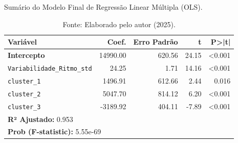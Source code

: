 \begin{table}[H]
\centering
\caption{Sumário do Modelo Final de Regressão Linear Múltipla (OLS).}
\label{tab:modelo_regressao}
\begin{tabular}{lrrrr}
\toprule
\textbf{Variável} & \textbf{Coef.} & \textbf{Erro Padrão} & \textbf{t} & \textbf{P>|t|} \\
\midrule
\textbf{Intercepto} & 14990.00 & 620.56 & 24.15 & <0.001 \\
\texttt{Variabilidade\_Ritmo\_std} & 24.25 & 1.71 & 14.16 & <0.001 \\
\texttt{cluster\_1} & 1496.91 & 612.66 & 2.44 & 0.016 \\
\texttt{cluster\_2} & 5047.70 & 814.12 & 6.20 & <0.001 \\
\texttt{cluster\_3} & -3189.92 & 404.11 & -7.89 & <0.001 \\
\midrule
\multicolumn{5}{l}{\textbf{R² Ajustado:} 0.953} \\
\multicolumn{5}{l}{\textbf{Prob (F-statistic):} 5.55e-69} \\
\bottomrule
\end{tabular}
\caption*{Fonte: Elaborado pelo autor (2025).}
\end{table}

